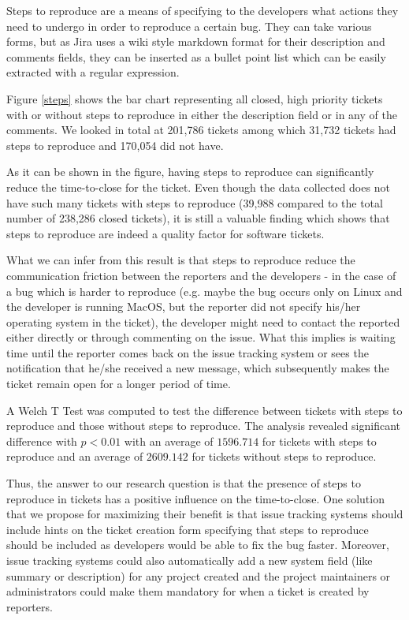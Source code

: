 \documentclass{mpaper}
\begin{document}
Steps to reproduce are a means of specifying to the developers what actions they need to undergo in order 
to reproduce a certain bug. They can take various forms, but as Jira uses a wiki style markdown format for 
their description and comments fields, they can be inserted as a bullet point list which can be easily 
extracted with a regular expression.

Figure \ref{steps} shows the bar chart representing all closed, high priority tickets with or without steps 
to reproduce in either the description field or in any of the comments. We looked in total at 201,786 tickets 
among which 31,732 tickets had steps to reproduce and 170,054 did not have.

As it can be shown in the figure, having steps to reproduce can significantly reduce the time-to-close 
for the ticket. Even though the data collected does not have such many tickets with steps to reproduce 
(39,988 compared to the total number of 238,286 closed tickets), it is still a valuable finding which shows 
that steps to reproduce are indeed a quality factor for software tickets. 

What we can infer from this result is that steps to reproduce reduce the communication friction between 
the reporters and the developers - in the case of a bug which is harder to reproduce (e.g. maybe the 
bug occurs only on Linux and the developer is running MacOS, but the reporter did not specify his/her 
operating system in the ticket), the developer might need to contact the reported either directly or 
through commenting on the issue. What this implies is waiting time until the reporter comes back on the 
issue tracking system or sees the notification that he/she received a new message, which subsequently makes 
the ticket remain open for a longer period of time. 

A Welch T Test was computed to test the difference between tickets with steps to reproduce 
and those without steps to reproduce. The analysis revealed significant difference with 
$p < 0.01$ with an average of $1596.714$ for tickets with steps to reproduce and an average of 
$2609.142$ for tickets without steps to reproduce.

Thus, the answer to our research question is that the presence of steps to reproduce in tickets 
has a positive influence on the time-to-close. One solution that we propose for maximizing their benefit 
is that issue tracking systems should include hints on the ticket creation form specifying that 
steps to reproduce should be included as developers would be able to fix the bug faster. Moreover, 
issue tracking systems could also automatically add a new system field (like summary or description) 
for any project created and the project maintainers or administrators could make them mandatory for 
when a ticket is created by reporters.
\end{document}
